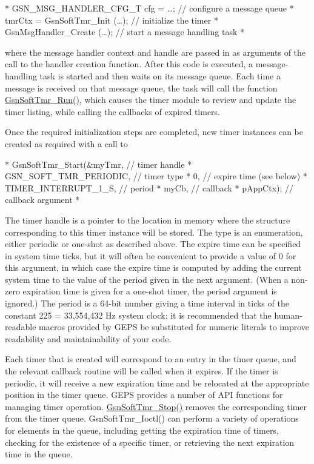 \begin{DoxyVerb}
 *    GSN_MSG_HANDLER_CFG_T cfg = {…};     // configure a message queue
 *       tmrCtx = GsnSoftTmr_Init (…);     // initialize the timer
 *       GsnMsgHandler_Create (…);         // start a message handling task
 *    \end{DoxyVerb}


where the message handler context and handle are passed in as arguments of the call to the handler creation function. After this code is executed, a message-\/handling task is started and then waits on its message queue. Each time a message is received on that message queue, the task will call the function \hyperlink{a00673_ga14b04d16861c3ae86cbd69b254e60873}{GsnSoftTmr\_\-Run()}, which causes the timer module to review and update the timer listing, while calling the callbacks of expired timers. \par
 \par
 Once the required initialization steps are completed, new timer instances can be created as required with a call to \begin{DoxyVerb}
 *    GsnSoftTmr_Start(&myTmr, 	// timer handle
 *       GSN_SOFT_TMR_PERIODIC,	// timer type
 *       0,	                    // expire time (see below)
 *       TIMER_INTERRUPT_1_S, 	// period
 *       myCb, 	                // callback
 *       pAppCtx);	            // callback argument
 *    \end{DoxyVerb}


The timer handle is a pointer to the location in memory where the structure corresponding to this timer instance will be stored. The type is an enumeration, either periodic or one-\/shot as described above. The expire time can be specified in system time ticks, but it will often be convenient to provide a value of 0 for this argument, in which case the expire time is computed by adding the current system time to the value of the period given in the next argument. (When a non-\/zero expiration time is given for a one-\/shot timer, the period argument is ignored.) The period is a 64-\/bit number giving a time interval in ticks of the constant 225 = 33,554,432 Hz system clock; it is recommended that the human-\/readable macros provided by GEPS be substituted for numeric literals to improve readability and maintainability of your code. \par
 \par
 Each timer that is created will correspond to an entry in the timer queue, and the relevant callback routine will be called when it expires. If the timer is periodic, it will receive a new expiration time and be relocated at the appropriate position in the timer queue. GEPS provides a number of API functions for managing timer operation. \hyperlink{a00673_gad048a3743bc158c60bc6382309d04398}{GsnSoftTmr\_\-Stop()} removes the corresponding timer from the timer queue. GsnSoftTmr\_\-Ioctl() can perform a variety of operations for elements in the queue, including getting the expiration time of timers, checking for the existence of a specific timer, or retrieving the next expiration time in the queue. \par
 \par


